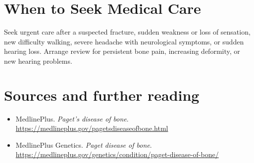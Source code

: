 \section*{When to Seek Medical Care}
Seek urgent care after a suspected fracture, sudden weakness or loss of sensation, new difficulty walking, severe headache with neurological symptoms, or sudden hearing loss. Arrange review for persistent bone pain, increasing deformity, or new hearing problems.

\section*{Sources and further reading}
\begin{itemize}
\item MedlinePlus. \textit{Paget's disease of bone}. \url{https://medlineplus.gov/pagetsdiseaseofbone.html}
\item MedlinePlus Genetics. \textit{Paget disease of bone}. \url{https://medlineplus.gov/genetics/condition/paget-disease-of-bone/}
\end{itemize}
